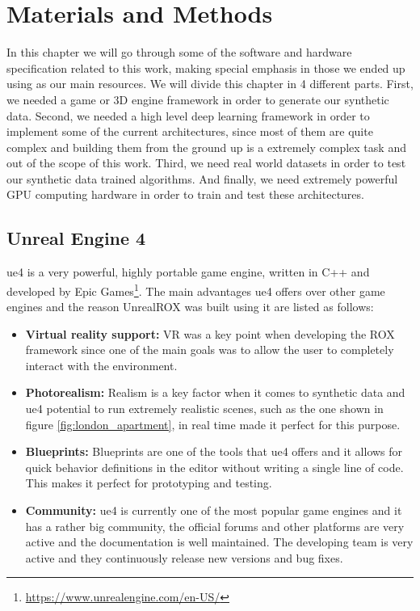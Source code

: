 
\chapter{Materials and Methods}
\label{metodologia}
In this chapter we will go through some of the software and hardware specification related to this work, making special emphasis in those we ended up using as our main resources. We will divide this chapter in 4 different parts. First, we needed a game or 3D engine framework in order to generate our synthetic data. Second, we needed a high level deep learning framework in order to implement some of the current architectures, since most of them are quite complex and building them from the ground up is a extremely complex task and out of the scope of this work. Third, we need real world datasets in order to test our synthetic data trained algorithms. And finally, we need extremely powerful GPU computing hardware in order to train and test these architectures.

\section{Unreal Engine 4}
\gls{ue4} is a very powerful, highly portable game engine, written in C++ and developed by Epic Games\footnote{\url{https://www.unrealengine.com/en-US/}}.
The main advantages \gls{ue4} offers over other game engines and the reason UnrealROX was built using it are listed as follows:

\begin{itemize}
	\item \textbf{Virtual reality support:} VR was a key point when developing the ROX framework since one of the main goals was to allow the user to completely interact with the environment.
	\item \textbf{Photorealism:} Realism is a key factor when it comes to synthetic data and \gls{ue4} potential to run extremely realistic scenes, such as the one shown in figure \ref{fig:london_apartment}, in real time made it perfect for this purpose.
	\item \textbf{Blueprints:} Blueprints are one of the tools that \gls{ue4} offers and it allows for quick behavior definitions in the editor without writing a single line of code. This makes it perfect for prototyping and testing.
	\item \textbf{Community:} \gls{ue4} is currently one of the most popular game engines and it has a rather big community, the official forums and other platforms are very active and the documentation is well maintained. The developing team is very active and they continuously release new versions and bug fixes. 
\end{itemize}

